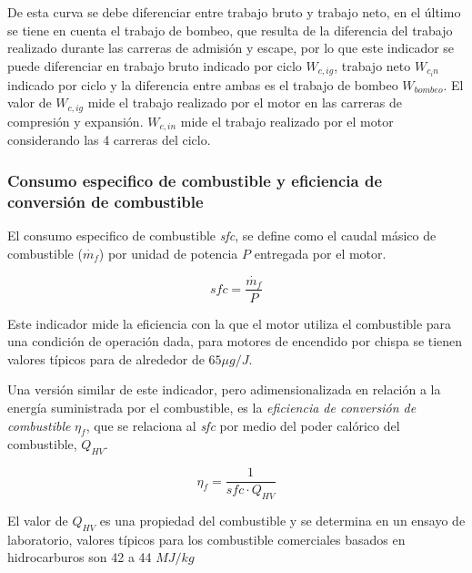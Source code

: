 De esta curva se debe diferenciar entre trabajo bruto y trabajo neto, en el
último se tiene en cuenta el trabajo de bombeo, que resulta de la diferencia
del trabajo realizado durante las carreras de admisión y escape, por lo que
este indicador se puede diferenciar en trabajo bruto indicado por ciclo
$W_{c,ig}$, trabajo neto $W_{c_in}$ indicado por ciclo y la diferencia entre
ambas es el trabajo de bombeo $W_{bombeo}$.
%
El valor de $W_{c,ig}$ mide el trabajo realizado por el motor en las carreras
de compresión y expansión.
%
$W_{c,in}$ mide el trabajo realizado por el motor considerando las 4 carreras
del ciclo.




\subsubsection{Consumo especifico de combustible y eficiencia de conversión de
combustible}
%
El consumo especifico de combustible \emph{sfc}, se define como el caudal
másico de combustible ($\dot{m_f}$) por unidad de potencia $P$ entregada por el
motor.

\begin{equation}\label{eq:sfc}
    sfc = \frac{\dot{m_f}}{P}
\end{equation}

Este indicador mide la eficiencia con la que el motor utiliza el combustible
para una condición de operación dada, para motores de encendido por chispa se
tienen valores típicos para de alrededor de $65\mu g/J$.

Una versión similar de este indicador, pero adimensionalizada en relación a la
energía suministrada por el combustible, es la \emph{eficiencia de conversión
de combustible} $\eta_f$, que se relaciona al \emph{sfc} por medio del poder
calórico del combustible, $Q_{HV}$.

\begin{equation}\label{eq:eta_f}
    \eta_f = \frac{1}{sfc \cdot Q_{HV}}
\end{equation}

El valor de $Q_{HV}$ es una propiedad del combustible y se determina en un
ensayo de laboratorio, valores típicos para los combustible comerciales
basados en hidrocarburos son 42 a 44 $MJ/kg$


